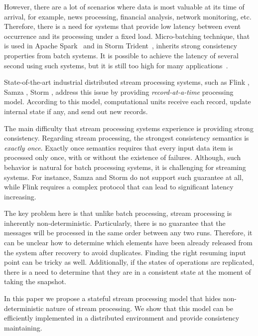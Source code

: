 \documentclass[sigconf]{acmart}
\theoremstyle{remark}
\begin{document}
However, there are a lot of scenarios where data is most valuable at its time of arrival, for example, news processing, financial analysis, network monitoring, etc. Therefore, there is a need for systems that provide low latency between event occurrence and its processing under a fixed load. Micro-batching technique, that is used in Apache Spark~\cite{Zaharia:2012:DSE:2342763.2342773} and in Storm Trident~\cite{apache:storm:trident}, inherits strong consistency properties from batch systems. It is possible to achieve the latency of several second using such systems, but it is still too high for many applications~\cite{?}.

State-of-the-art industrial distributed stream processing systems, such as Flink \cite{carbone2015apache}, Samza \cite{Noghabi:2017:SSS:3137765.3137770}, Storm \cite{apache:storm}, address this issue by providing {\it record-at-a-time} processing model. According to this model, computational units receive each record, update internal state if any, and send out new records. 

The main difficulty that stream processing systems experience is providing strong consistency. Regarding stream processing, the strongest consistency semantics is {\it exactly once}. Exactly once semantics requires that every input data item is processed only once, with or without the existence of failures. Although, such behavior is natural for batch processing systems, it is challenging for streaming systems. For instance, Samza and Storm do not support such guarantee at all, while Flink requires a complex protocol that can lead to significant latency increasing.

The key problem here is that unlike batch processing, stream processing is inherently non-deterministic. Particularly, there is no guarantee that the messages will be processed in the same order between any two runs. Therefore, it can be unclear how to determine which elements have been already released from the system after recovery to avoid duplicates. Finding the right resuming input point can be tricky as well. Additionally, if the states of operations are replicated, there is a need to determine that they are in a consistent state at the moment of taking the snapshot. 

In this paper we propose a stateful stream processing model that hides non-deterministic nature of stream processing. We show that this model can be efficiently implemented in a distributed environment and provide consistency maintaining.
\end{document}
